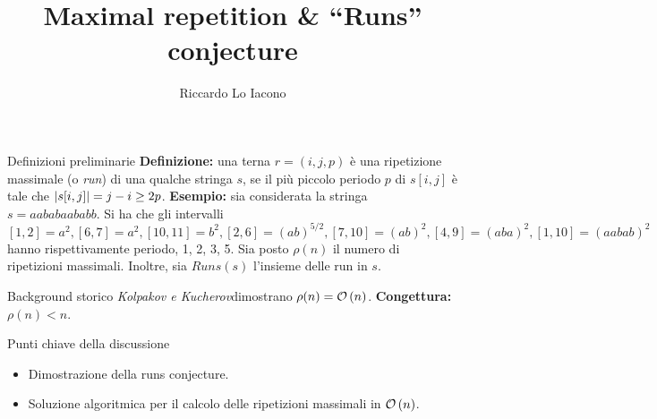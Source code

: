 \documentclass{beamer}
\title{Maximal repetition \& ``Runs'' conjecture}
\author{Riccardo Lo Iacono}
\begin{document}
    \begin{frame}
        \maketitle
    \end{frame}

    \begin{frame}{Definizioni preliminarie}
        \textbf{Definizione: } una terna \(r = (i, j, p)\) è una ripetizione 
        massimale (o \emph{run}) di una qualche stringa \(s\),
        se il più piccolo periodo \(p\) di \(s[i, j]\) è tale che 
        \(\left\lvert s[i, j] \right\rvert = j - i \ge 2p\). 
        \vskip 10pt 
        \textbf{Esempio:} sia considerata la stringa \(s = aababaababb\).
        Si ha che gli intervalli \([1,2] = a^{2} , [6,7] = a^{2}, 
        [10,11] = b^{2}, [2, 6] = (ab)^{5\slash 2}, [7, 10] = (ab)^{2},
        [4, 9] = (aba)^{2}, [1, 10] = (aabab)^{2}\)
        hanno rispettivamente periodo, 1, 2, 3, 5.
        \vskip 10pt 
        Sia posto \(\rho(n)\) il numero di ripetizioni massimali.
        Inoltre, sia \(Runs(s)\) l'insieme delle run in \(s\). 
    \end{frame}

    \begin{frame}{Background storico}
        \emph{Kolpakov \emph{e} Kucherov}\footnotemark[1]
        dimostrano \(\rho(n) = \mathcal{O} \left\lparen n \right\rparen\).
        \vskip 10pt
        \textbf{Congettura: } \(\rho (n) < n\).

    \end{frame}
           
    \begin{frame}{Punti chiave della discussione}
        \begin{itemize}
            \item Dimostrazione della runs conjecture.
            \item Soluzione algoritmica per il calcolo delle ripetizioni 
                massimali in \(\mathcal{O} \left\lparen n \right\rparen\).
        \end{itemize}
    \end{frame}
\end{document}
